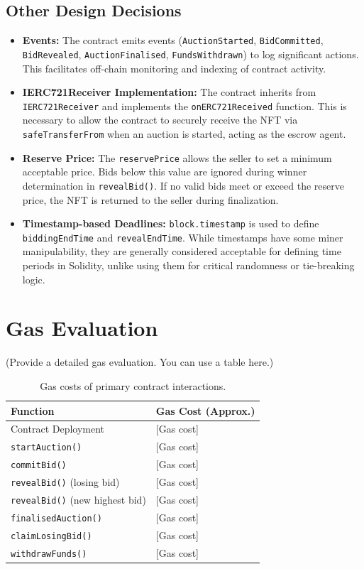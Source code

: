 \documentclass[11pt, a4paper]{article}
\begin{document}
\subsection{Other Design Decisions}
\begin{itemize}
    \item \textbf{Events:} The contract emits events (\texttt{AuctionStarted}, \texttt{BidCommitted}, \texttt{BidRevealed}, \texttt{AuctionFinalised}, \texttt{FundsWithdrawn}) to log significant actions. This facilitates off-chain monitoring and indexing of contract activity.
    \item \textbf{IERC721Receiver Implementation:} The contract inherits from \texttt{IERC721Receiver} and implements the \texttt{onERC721Received} function. This is necessary to allow the contract to securely receive the NFT via \texttt{safeTransferFrom} when an auction is started, acting as the escrow agent.
    \item \textbf{Reserve Price:} The \texttt{reservePrice} allows the seller to set a minimum acceptable price. Bids below this value are ignored during winner determination in \texttt{revealBid()}. If no valid bids meet or exceed the reserve price, the NFT is returned to the seller during finalization.
    \item \textbf{Timestamp-based Deadlines:} \texttt{block.timestamp} is used to define \texttt{biddingEndTime} and \texttt{revealEndTime}. While timestamps have some miner manipulability, they are generally considered acceptable for defining time periods in Solidity, unlike using them for critical randomness or tie-breaking logic.
\end{itemize}


\section{Gas Evaluation}
(Provide a detailed gas evaluation. You can use a table here.)

\begin{table}[ht]
\centering
\begin{tabular}{ll}
\toprule
\textbf{Function} & \textbf{Gas Cost (Approx.)} \\
\midrule
Contract Deployment & [Gas cost] \\
\texttt{startAuction()} & [Gas cost] \\
\texttt{commitBid()} & [Gas cost] \\
\texttt{revealBid()} (losing bid) & [Gas cost] \\
\texttt{revealBid()} (new highest bid) & [Gas cost] \\
\texttt{finalisedAuction()} & [Gas cost] \\
\texttt{claimLosingBid()} & [Gas cost] \\
\texttt{withdrawFunds()} & [Gas cost] \\
\bottomrule
\end{tabular}
\caption{Gas costs of primary contract interactions.}
\label{tab:gas}
\end{table}
\end{document}

